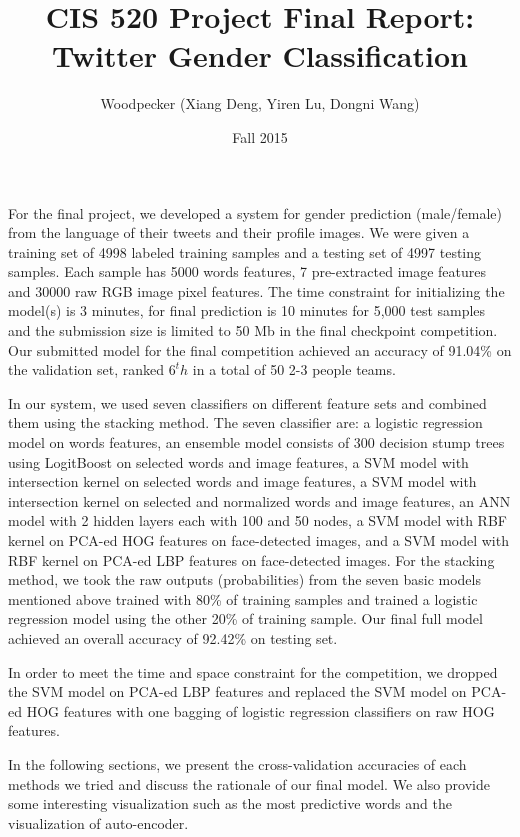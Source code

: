 \documentclass[english]{article}
\title{CIS 520 Project Final Report: Twitter Gender Classification}
\author{Woodpecker (Xiang Deng, Yiren Lu, Dongni Wang)}
\date{Fall 2015}
\begin{document}
\maketitle
For the final project, we developed a system for gender prediction (male/female) from the language of their tweets and their profile images. We were given a training set of 4998 labeled training samples and a testing set of 4997 testing samples. Each sample has 5000 words features, 7 pre-extracted image features and 30000 raw RGB image pixel features. The time constraint for initializing the model(s) is 3 minutes, for final prediction is 10 minutes for 5,000 test samples and the submission size is limited to 50 Mb in the final checkpoint competition. Our submitted model for the final competition achieved an accuracy of 91.04\% on the validation set, ranked $6^th$ in a total of 50 2-3 people teams. \par
In our system, we used seven classifiers on different feature sets and combined them using the stacking method.
The seven classifier are: a logistic regression model on words features, an ensemble model consists of 300 decision stump trees using LogitBoost on selected words and image features, a SVM model with intersection kernel on selected words and image features, a SVM model with intersection kernel on selected and normalized words and image features, an ANN model with 2 hidden layers each with 100 and 50 nodes, a SVM model with RBF kernel on PCA-ed HOG features on face-detected images, and a SVM model with RBF kernel on PCA-ed LBP features on face-detected images. For the stacking method, we took the raw outputs (probabilities) from the seven basic models mentioned above trained with 80\% of training samples and trained a logistic regression model using the other 20\% of training sample. Our final full model achieved an overall accuracy of 92.42\% on testing set. \par
 In order to meet the time and space constraint for the competition, we dropped the SVM model on PCA-ed LBP features and replaced the SVM model on PCA-ed HOG features with one bagging of logistic regression classifiers on raw HOG features. \par
In the following sections, we present the cross-validation accuracies of each methods we tried and discuss the rationale of our final model. We also provide some interesting visualization such as the most predictive words and the visualization of auto-encoder.  

\begin{center}
\end{center}






\end{document}
